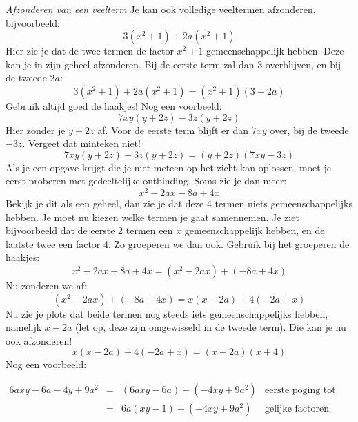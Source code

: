 \emph{Afzonderen van een veelterm}
Je kan ook volledige veeltermen afzonderen, bijvoorbeeld:
\begin{equation*}
3(x^2+1)+2a(x^2+1)
\end{equation*}
Hier zie je dat de twee termen de factor $x^2+1$ gemeenschappelijk hebben. Deze kan je in zijn geheel afzonderen. Bij de eerste term zal dan $3$ overblijven, en bij de tweede $2a$:
\begin{equation*}
3(x^2+1)+2a(x^2+1)=(x^2+1)(3+2a)
\end{equation*}
Gebruik altijd goed de haakjes! Nog een voorbeeld:
\begin{equation*}
7xy(y+2z)-3z(y+2z)
\end{equation*}
Hier zonder je $y+2z$ af. Voor de eerste term blijft er dan $7xy$ over, bij de tweede $-3z$. Vergeet dat minteken niet!
\begin{equation*}
7xy(y+2z)-3z(y+2z)=(y+2z)(7xy-3z)
\end{equation*}
Als je een opgave krijgt die je niet meteen op het zicht kan oplossen, moet je eerst proberen met gedeeltelijke ontbinding. Soms zie je dan meer:
\begin{equation*}
x^2-2ax-8a+4x
\end{equation*}
Bekijk je dit als een geheel, dan zie je dat deze 4 termen niets gemeenschappelijks hebben. Je moet nu kiezen welke termen je gaat samennemen. Je ziet bijvoorbeeld dat de eerste 2 termen een $x$ gemeenschappelijk hebben, en de laatste twee een factor 4. Zo groeperen we dan ook. Gebruik bij het groeperen de haakjes:
\begin{equation*}
x^2-2ax-8a+4x=(x^2-2ax)+(-8a+4x)
\end{equation*}
Nu zonderen we af:
\begin{equation*}
(x^2-2ax)+(-8a+4x)=x(x-2a)+4(-2a+x)
\end{equation*}
Nu zie je plots dat beide termen nog steeds iets gemeenschappelijks hebben, namelijk $x-2a$ (let op, deze zijn omgewisseld in de tweede term). Die kan je nu ook afzonderen!
\begin{equation*}
x(x-2a)+4(-2a+x)=(x-2a)(x+4)
\end{equation*}
Nog een voorbeeld:

\begin{center}
	$\begin{array}{ccll}
	6axy-6a-4y+9a^2 &=& (6axy-6a)+(-4xy+9a^2) &\text{eerste poging tot groeperen} \\
	&=& 6a(xy-1)+(-4xy+9a^2) &\text{gelijke factoren afzonderen} \\
	\end{array}$
\end{center}

